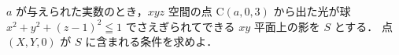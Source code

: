 \documentclass[../../main.tex]{subfiles}
\begin{document}
$a$ が与えられた実数のとき，$xyz$ 空間の点 C$(a,0,3)$ から出た光が球 $x^2+y^2+(z-1)^2 \leqq 1$ でさえぎられてできる $xy$ 平面上の影を $S$ とする．
点 $(X,Y,0)$ が $S$ に含まれる条件を求めよ．
\end{document}
